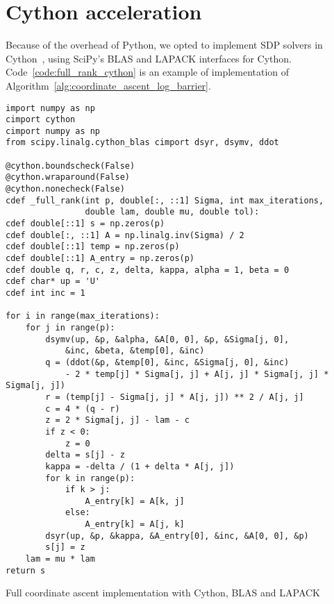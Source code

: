 \chapter{Cython acceleration}\label{ch:cython_acceleration}
Because of the overhead of Python, we opted to implement SDP solvers in Cython~\citep{cython},
using SciPy's BLAS and LAPACK interfaces for Cython.
Code~\ref{code:full_rank_cython} is an example of implementation of Algorithm~\ref{alg:coordinate_ascent_log_barrier}.
\begin{calgorithm}
\begin{verbatim}
import numpy as np
cimport cython
cimport numpy as np
from scipy.linalg.cython_blas cimport dsyr, dsymv, ddot

@cython.boundscheck(False)
@cython.wraparound(False)
@cython.nonecheck(False)
cdef _full_rank(int p, double[:, ::1] Sigma, int max_iterations,
                double lam, double mu, double tol):
cdef double[::1] s = np.zeros(p)
cdef double[:, ::1] A = np.linalg.inv(Sigma) / 2
cdef double[::1] temp = np.zeros(p)
cdef double[::1] A_entry = np.zeros(p)
cdef double q, r, c, z, delta, kappa, alpha = 1, beta = 0
cdef char* up = 'U'
cdef int inc = 1

for i in range(max_iterations):
    for j in range(p):
        dsymv(up, &p, &alpha, &A[0, 0], &p, &Sigma[j, 0],
            &inc, &beta, &temp[0], &inc)
        q = (ddot(&p, &temp[0], &inc, &Sigma[j, 0], &inc)
            - 2 * temp[j] * Sigma[j, j] + A[j, j] * Sigma[j, j] * Sigma[j, j])
        r = (temp[j] - Sigma[j, j] * A[j, j]) ** 2 / A[j, j]
        c = 4 * (q - r)
        z = 2 * Sigma[j, j] - lam - c
        if z < 0:
            z = 0
        delta = s[j] - z
        kappa = -delta / (1 + delta * A[j, j])
        for k in range(p):
            if k > j:
                A_entry[k] = A[k, j]
            else:
                A_entry[k] = A[j, k]
        dsyr(up, &p, &kappa, &A_entry[0], &inc, &A[0, 0], &p)
        s[j] = z
    lam = mu * lam
return s
\end{verbatim}
\caption{
    Full coordinate ascent implementation with Cython, BLAS and LAPACK
}\label{code:full_rank_cython}
\end{calgorithm}

